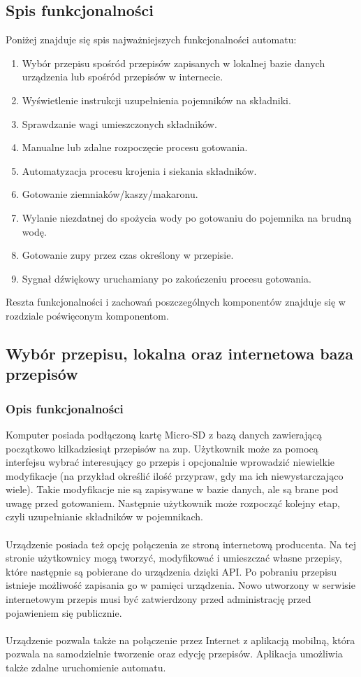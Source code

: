 \documentclass[12pt,a4paper,notitlepage]{report}
\begin{document}
\subsection{Spis funkcjonalności}
Poniżej znajduje się spis najważniejszych funkcjonalności automatu:
\begin{enumerate}
  \item Wybór przepisu spośród przepisów zapisanych w lokalnej bazie danych urządzenia lub spośród przepisów w internecie.
  \item Wyświetlenie instrukcji uzupełnienia pojemników na składniki.
  \item Sprawdzanie wagi umieszczonych składników.
  \item Manualne lub zdalne rozpoczęcie procesu gotowania.
  \item Automatyzacja procesu krojenia i siekania składników.
  \item Gotowanie ziemniaków/kaszy/makaronu.
  \item Wylanie niezdatnej do spożycia wody po gotowaniu do pojemnika na brudną wodę.
  \item Gotowanie zupy przez czas określony w przepisie.
  \item Sygnał dźwiękowy uruchamiany po zakończeniu procesu gotowania.
\end{enumerate}
Reszta funkcjonalności i zachowań poszczególnych komponentów znajduje się w rozdziale poświęconym komponentom.

\subsection{Wybór przepisu, lokalna oraz internetowa baza przepisów}
\subsubsection{Opis funkcjonalności}
Komputer posiada podłączoną kartę Micro-SD z bazą danych zawierającą początkowo kilkadziesiąt przepisów na zup. Użytkownik może za pomocą interfejsu wybrać interesujący go przepis i opcjonalnie wprowadzić niewielkie modyfikacje (na przykład określić ilość przypraw, gdy ma ich niewystarczająco wiele). Takie modyfikacje nie są zapisywane w bazie danych, ale są brane pod uwagę przed gotowaniem. Następnie użytkownik może rozpocząć kolejny etap, czyli uzupełnianie składników w pojemnikach.\\ \\
Urządzenie posiada też opcję połączenia ze stroną internetową producenta. Na tej stronie użytkownicy mogą tworzyć, modyfikować i umieszczać własne przepisy, które następnie są pobierane do urządzenia dzięki API. Po pobraniu przepisu istnieje możliwość zapisania go w pamięci urządzenia. Nowo utworzony w serwisie internetowym przepis musi być zatwierdzony przed administrację przed pojawieniem się publicznie.\\ \\
Urządzenie pozwala także na połączenie przez Internet z aplikacją mobilną, która pozwala na samodzielnie tworzenie oraz edycję przepisów. Aplikacja umożliwia także zdalne uruchomienie automatu.\\
\end{document}
